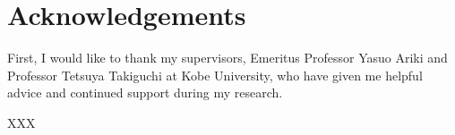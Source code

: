 \chapter{Acknowledgements}

First, I would like to thank my supervisors, Emeritus Professor Yasuo Ariki and Professor Tetsuya Takiguchi at Kobe University, 
who have given me helpful advice and continued support during my research. 

XXX


